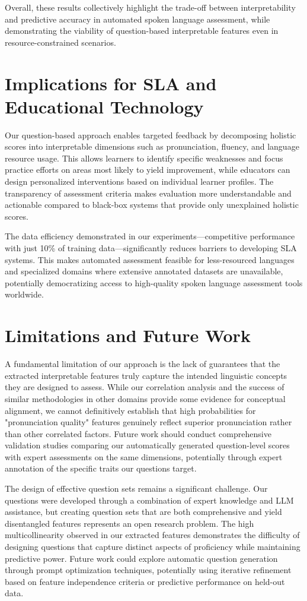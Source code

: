 \documentclass{report}
\begin{document}
Overall, these results collectively highlight the trade-off between interpretability and predictive accuracy in automated spoken language assessment, while demonstrating the viability of question-based interpretable features even in resource-constrained scenarios.

\section{Implications for SLA and Educational Technology}
Our question-based approach enables targeted feedback by decomposing holistic scores into interpretable dimensions such as pronunciation, fluency, and language resource usage. This allows learners to identify specific weaknesses and focus practice efforts on areas most likely to yield improvement, while educators can design personalized interventions based on individual learner profiles. The transparency of assessment criteria makes evaluation more understandable and actionable compared to black-box systems that provide only unexplained holistic scores.

The data efficiency demonstrated in our experiments—competitive performance with just 10\% of training data—significantly reduces barriers to developing SLA systems. This makes automated assessment feasible for less-resourced languages and specialized domains where extensive annotated datasets are unavailable, potentially democratizing access to high-quality spoken language assessment tools worldwide.

\section{Limitations and Future Work}
A fundamental limitation of our approach is the lack of guarantees that the extracted interpretable features truly capture the intended linguistic concepts they are designed to assess. While our correlation analysis and the success of similar methodologies in other domains provide some evidence for conceptual alignment, we cannot definitively establish that high probabilities for "pronunciation quality" features genuinely reflect superior pronunciation rather than other correlated factors. Future work should conduct comprehensive validation studies comparing our automatically generated question-level scores with expert assessments on the same dimensions, potentially through expert annotation of the specific traits our questions target.

The design of effective question sets remains a significant challenge. Our questions were developed through a combination of expert knowledge and LLM assistance, but creating question sets that are both comprehensive and yield disentangled features represents an open research problem. The high multicollinearity observed in our extracted features demonstrates the difficulty of designing questions that capture distinct aspects of proficiency while maintaining predictive power. Future work could explore automatic question generation through prompt optimization techniques, potentially using iterative refinement based on feature independence criteria or predictive performance on held-out data.
\end{document}
